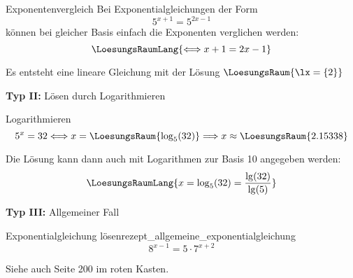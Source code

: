 \begin{rezept}{Exponentenvergleich}{}
Bei Exponentialgleichungen der Form $$5^{x+1} = 5^{2x-1}$$ können bei
gleicher Basis einfach die Exponenten verglichen werden:
$$\LoesungsRaumLang{\Longleftrightarrow x+1=2x-1}$$

Es entsteht eine lineare Gleichung mit der Lösung $\LoesungsRaum{\lx = \{2\}}$
\end{rezept}

\textbf{Typ II:} Lösen durch Logarithmieren\\

\begin{rezept}{Logarithmieren}{}
$$5^x=32 \Longleftrightarrow x=\LoesungsRaum{\log_5(32)} \Longrightarrow x \approx \LoesungsRaum{2.15338}$$

Die Lösung kann dann auch mit Logarithmen zur Basis 10 angegeben
werden:
$$\LoesungsRaumLang{x = \log_5(32) = \frac{\lg(32)}{\lg(5)}}$$
\end{rezept}
\newpage

\textbf{Typ III:} Allgemeiner Fall\\

\begin{rezept}{Exponentialgleichung lösen}{rezept_allgemeine_exponentialgleichung}
$$8^{x-1}=5\cdot{}7^{x+2}$$
\end{rezept}

Siehe auch \cite{marthaler21alg} Seite 200 im roten Kasten.



